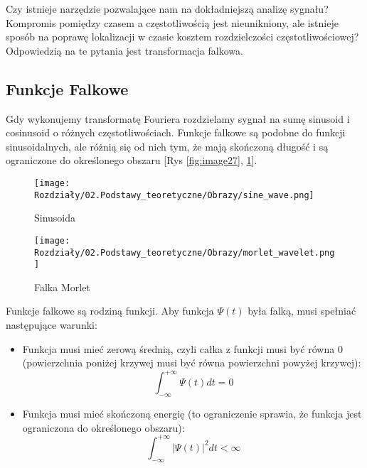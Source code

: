 Czy istnieje narzędzie pozwalające nam na dokładniejszą analizę sygnału? Kompromis pomiędzy czasem a częstotliwością jest nieunikniony, ale istnieje sposób na poprawę lokalizacji w czasie kosztem rozdzielczości częstotliwościowej? Odpowiedzią na te pytania jest transformacja falkowa.


\subsection*{Funkcje Falkowe}

Gdy wykonujemy transformatę Fouriera rozdzielamy sygnał na sumę sinusoid i cosinusoid o różnych częstotliwościach. Funkcje falkowe są podobne do funkcji sinusoidalnych, ale różnią się od nich tym, że mają skończoną długość i są ograniczone do określonego obszaru [Rys \ref{fig:image27}, \ref{fig:image28}].

\begin{figure}[H]
    \centering
    \begin{minipage}[t]{0.3\linewidth}
        \texttt{[image: Rozdziały/02.Podstawy\_teoretyczne/Obrazy/sine\_wave.png]}
        \caption{Sinusoida}
        \label{fig:image27}
    \end{minipage}
    \hspace{0.5cm}
    \begin{minipage}[t]{0.3\linewidth}
        \texttt{[image: Rozdziały/02.Podstawy\_teoretyczne/Obrazy/morlet\_wavelet.png]}
        \caption{Falka Morlet}
        \label{fig:image28}
    \end{minipage}
\end{figure}


Funkcje falkowe są rodziną funkcji. Aby funkcja $\Psi(t)$ była falką, musi spełniać następujące warunki:
\begin{itemize}
    \item Funkcja musi mieć zerową średnią, czyli całka z funkcji musi być równa 0 (powierzchnia poniżej krzywej musi być równa powierzchni powyżej krzywej):
        \begin{equation}
            \int_{-\infty}^{+\infty} \Psi(t) d t=0
        \end{equation}
    \item Funkcja musi mieć skończoną energię (to ograniczenie sprawia, że funkcja jest ograniczona do określonego obszaru):
        \begin{equation}
            \int_{-\infty}^{+\infty}|\Psi(t)|^{2} d t<\infty
        \end{equation}
\end{itemize}

